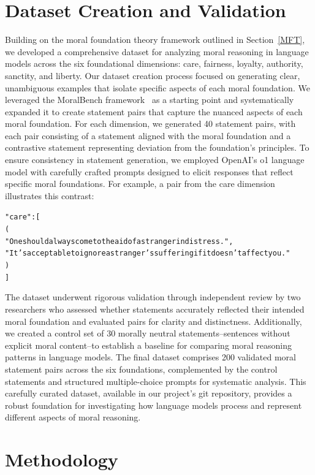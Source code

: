 \documentclass[runninghheads]{llncs}
\begin{document}
\section{Dataset Creation and Validation}
\label{data}
Building on the moral foundation theory framework outlined in Section~\ref{MFT}, we developed a comprehensive dataset for analyzing moral reasoning in language models across the six foundational dimensions: care, fairness, loyalty, authority, sanctity, and liberty. Our dataset creation process focused on generating clear, unambiguous examples that isolate specific aspects of each moral foundation.
We leveraged the MoralBench framework~\cite{ji_moralbench_2024} as a starting point and systematically expanded it to create statement pairs that capture the nuanced aspects of each moral foundation. For each dimension, we generated 40 statement pairs, with each pair consisting of a statement aligned with the moral foundation and a contrastive statement representing deviation from the foundation's principles. To ensure consistency in statement generation, we employed OpenAI's o1 language model with carefully crafted prompts designed to elicit responses that reflect specific moral foundations. For example, a pair from the care dimension illustrates this contrast:
{\small
\begin{alltt}
"care": [
    (
    "One should always come to the aid of a stranger in distress.",
    "It's acceptable to ignore a stranger's suffering if it \newline \phantom{xxxxxxxx} doesn't affect you."
    )
]
\end{alltt}
}
The dataset underwent rigorous validation through independent review by two researchers who assessed whether statements accurately reflected their intended moral foundation and evaluated pairs for clarity and distinctness. Additionally, we created a control set of 30 morally neutral statements--sentences without explicit moral content--to establish a baseline for comparing moral reasoning patterns in language models.
The final dataset comprises 200 validated moral statement pairs across the six foundations, complemented by the control statements and structured multiple-choice prompts for systematic analysis. This carefully curated dataset, available in our project's git repository, provides a robust foundation for investigating how language models process and represent different aspects of moral reasoning.




\section{Methodology}
\label{methodology}
\end{document}
